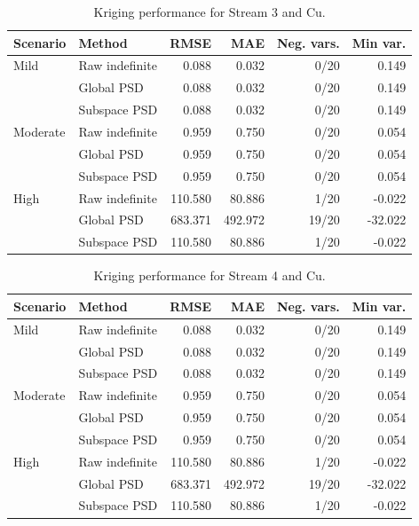 \documentclass[smallextended]{svjour3}
\newcommand{\1}{\mathbf{1}}
\begin{document}
\begin{table}[htbp]
\centering
\caption{Kriging performance for Stream 3 and Cu.}
\label{tab:performance_stream_3_Cu}
\begin{tabular}{llrrrr}
	\hline
	Scenario & Method & RMSE & MAE & Neg. vars. & Min var. \\
	\hline
	Mild & Raw indefinite & 0.088 & 0.032 & 0/20 & 0.149 \\
	& Global PSD & 0.088 & 0.032 & 0/20 & 0.149 \\
	& Subspace PSD & 0.088 & 0.032 & 0/20 & 0.149 \\
	\hline
	Moderate & Raw indefinite & 0.959 & 0.750 & 0/20 & 0.054 \\
	& Global PSD & 0.959 & 0.750 & 0/20 & 0.054 \\
	& Subspace PSD & 0.959 & 0.750 & 0/20 & 0.054 \\
	\hline
	High & Raw indefinite & 110.580 & 80.886 & 1/20 & -0.022 \\
	& Global PSD & 683.371 & 492.972 & 19/20 & -32.022 \\
	& Subspace PSD & 110.580 & 80.886 & 1/20 & -0.022 \\
	\hline
\end{tabular}
\end{table}


\begin{table}[htbp]
\centering
\caption{Kriging performance for Stream 4 and Cu.}
\label{tab:performance_stream_4_Cu}
\begin{tabular}{llrrrr}
	\hline
	Scenario & Method & RMSE & MAE & Neg. vars. & Min var. \\
	\hline
	Mild & Raw indefinite & 0.088 & 0.032 & 0/20 & 0.149 \\
	& Global PSD & 0.088 & 0.032 & 0/20 & 0.149 \\
	& Subspace PSD & 0.088 & 0.032 & 0/20 & 0.149 \\
	\hline
	Moderate & Raw indefinite & 0.959 & 0.750 & 0/20 & 0.054 \\
	& Global PSD & 0.959 & 0.750 & 0/20 & 0.054 \\
	& Subspace PSD & 0.959 & 0.750 & 0/20 & 0.054 \\
	\hline
	High & Raw indefinite & 110.580 & 80.886 & 1/20 & -0.022 \\
	& Global PSD & 683.371 & 492.972 & 19/20 & -32.022 \\
	& Subspace PSD & 110.580 & 80.886 & 1/20 & -0.022 \\
	\hline
\end{tabular}
\end{table}
\end{document}
